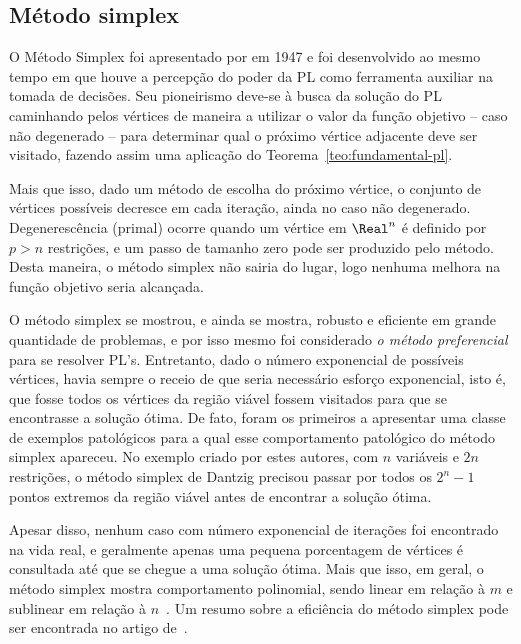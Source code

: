 \subsection{Método simplex}

O Método Simplex foi apresentado por
\textcite{Dantzig:Maximization-of-a-linear:1951y} em 1947 e foi desenvolvido ao
mesmo tempo em que houve a percepção do poder da \ac{PL} como ferramenta auxiliar na
tomada de decisões. Seu pioneirismo deve-se à busca da solução do \ac{PL}
caminhando pelos vértices de maneira a utilizar o valor da função objetivo --
caso não degenerado -- para determinar qual o próximo vértice adjacente deve ser
visitado, fazendo assim uma aplicação do Teorema~\ref{teo:fundamental-pl}.

Mais que isso, dado um método de escolha do próximo vértice, o conjunto de
vértices possíveis decresce em cada iteração,  ainda no caso não degenerado.
Degenerescência (primal) ocorre quando um vértice em $\Real^n$ é definido por
$p>n$ restrições, e um passo de tamanho zero pode ser produzido pelo método. Desta
maneira, o método simplex não sairia do lugar, logo nenhuma melhora na função
objetivo seria alcançada. 


O método simplex se mostrou, e ainda se mostra, robusto e eficiente em grande
quantidade de problemas, e por isso mesmo foi considerado \emph{o método
preferencial} para se resolver \ac{PL}'s. Entretanto, dado o número exponencial
de possíveis vértices, havia sempre o receio de que seria necessário esforço
exponencial, isto é, que fosse  todos os vértices da região viável fossem
visitados para que se encontrasse a solução ótima. De fato, \textcite{Klee:1972wi}
foram os primeiros a apresentar uma classe de exemplos patológicos para a qual esse
comportamento patológico do método simplex apareceu. No exemplo criado por estes
autores, com $n$ variáveis e $2n$ restrições, o método simplex de Dantzig 
precisou passar por todos os $2^n-1$ pontos extremos da região viável antes de
encontrar a solução ótima. 


Apesar disso, nenhum caso com número exponencial de iterações foi encontrado na
vida real, e geralmente apenas uma pequena porcentagem de vértices é
consultada até que se chegue a uma solução ótima. Mais que isso, em geral, o método
simplex mostra comportamento polinomial, sendo linear em relação à $m$ e
sublinear em relação à $n$~\cite[pg.~94]{Fang:1993wu}. Um resumo sobre a
eficiência do método simplex pode ser encontrada no artigo
de~\textcite{Shamir:1987th}.
 

